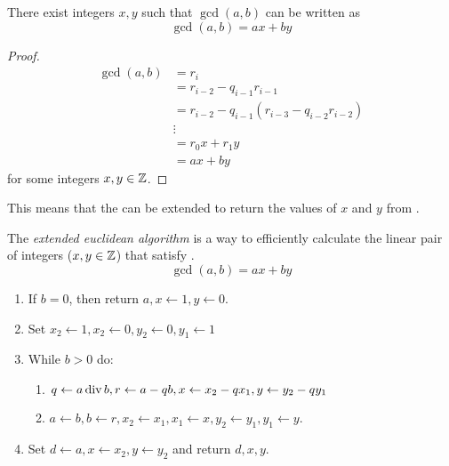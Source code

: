 \begin{theorem}
  There exist integers $x, y$ such that $\gcd(a, b)$ can be written as
  \begin{equation}\label{eq:Extended_Euclidean_Algorithm_Basis}
    \gcd(a, b) = ax + by
  \end{equation}
\end{theorem}
\begin{proof}
  \begin{align*}
    \gcd(a, b) &= r_{i} \\
               &= r_{i-2} - q_{i-1}r_{i-1} \\
               &= r_{i-2} - q_{i-1}(r_{i-3} - q_{i-2}r_{i-2}) \\
               &\vdots \\
               &= r_{0}x + r_{1}y \\
               &= ax + by
  \end{align*}
  for some integers $x, y \in \operatorname{\mathbb{Z}}$.
\end{proof}

This means that the  can be extended to return the values of $x$ and $y$ from .

\begin{definition}\label{def:Extended_Euclidean_Algorithm}
  The \emph{extended euclidean algorithm} is a way to efficiently calculate the linear pair of integers ($x, y \in \operatorname{\mathbb{Z}}$) that satisfy .
  \begin{equation*}
    \gcd(a, b) = ax + by
  \end{equation*}

  \begin{enumerate}[noitemsep]
  \item If $b = 0$, then return $a, x \leftarrow 1, y \leftarrow 0$.
  \item Set $x_{2} \leftarrow 1, x_{2} \leftarrow 0, y_{2} \leftarrow 0, y_{1} \leftarrow 1$
  \item While $b > 0$ do:
    \begin{enumerate}[noitemsep]
    \item $q \leftarrow a \operatorname{\text{div}} b, r \leftarrow a-qb, x \leftarrow x_{2} - qx_{1}, y \leftarrow y_{2} - qy_{1}$
    \item $a \leftarrow b, b \leftarrow r, x_{2} \leftarrow x_{1}, x_{1} \leftarrow x, y_{2} \leftarrow y_{1}, y_{1} \leftarrow y$.
    \end{enumerate}
  \item Set $d \leftarrow a, x \leftarrow x_{2}, y \leftarrow y_{2}$ and return $d, x, y$.
  \end{enumerate}
\end{definition}

